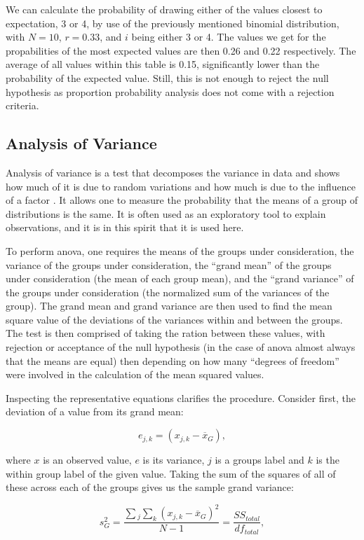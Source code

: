 We can calculate the probability of drawing either of the values closest
to expectation, 3 or 4, by use of the previously mentioned binomial distribution,
with $N = 10$, $r = 0.33$, and $i$ being either 3 or 4. The values we get for
the propabilities of the most expected values are then 0.26 and 0.22
respectively. The average of all values within this table is
0.15, significantly lower than the probability of the expected value.
Still, this is not enough to reject the null hypothesis as proportion
probability analysis does not come with a rejection criteria.

\subsection{Analysis of Variance}
Analysis of variance is a test that decomposes the variance in data and shows
how much of it is due to random variations and how much is due to the influence
of a factor \cite{Cohen}. It allows one to measure the probability that the means
of a group of distributions is the same. It is often used as an exploratory tool
to explain observations, and it is in this spirit that it is used here.

To perform anova, one requires the means of the groups under consideration, the
variance of the groups under consideration, the ``grand  mean'' of the groups
under consideration (the mean of each group mean), and the ``grand variance''
of the groups under consideration (the normalized sum of the variances of the
group). The grand mean and grand variance are then used to find the mean square
value of the deviations of the variances within and between the groups. The
test is then comprised of taking the ration between these values, with rejection
or acceptance of the null hypothesis (in the case of anova almost always that
the means are equal) then depending on how many ``degrees of freedom'' were
involved in the calculation of the mean squared values.

Inspecting the representative equations clarifies the procedure. Consider first,
the deviation of a value from its grand mean:

$$e_{j,k} = (x_{j,k} - \overline{x}_{G}),$$

where $x$ is an observed value, $e$ is its variance, $j$ is a groups label
and $k$ is the within group label of the given value. Taking the sum of the
squares of all of these across each of the groups gives us the sample grand
variance:

$$s_{G}^{2} = \frac{\sum{}_{j}\sum_{k}{(x_{j,k} - \overline{x}_{G})^{2}}}{N-1} = \frac{SS_{total}}{df_{total}},$$

